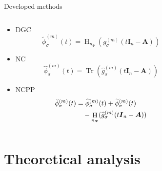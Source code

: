 \documentclass[aspectratio=169, leqno, 12pt]{beamer}
\newcommand{\mtx}[1]{\boldsymbol{#1}}
\DeclareMathOperator{\Tr}{Tr}
\DeclareMathOperator{\Hutch}{H}
\begin{document}
\begin{frame}{Developed methods}
    \begin{columns}
        \begin{column}{0.55\textwidth}
            \begin{itemize}
                \item \gls{DGC}
                \begin{equation}
                    \widetilde{\phi}_{\sigma}^{(m)}(t) = \Hutch_{n_{\Psi}}(g_{\sigma}^{(m)}(t\mtx{I}_n - \mtx{A}))
                \end{equation}
                \item \gls{NC}
                \begin{equation}
                    \widehat{\phi}_{\sigma}^{(m)}(t) = \Tr(\widehat{g}_{\sigma}^{(m)}(t\mtx{I}_n - \mtx{A}))
                \end{equation}
                \item \gls{NCPP}
                \begin{align}
                    \breve{\phi}_{\sigma}^{(m)}(t) &= \widehat{\phi}_{\sigma}^{(m)}(t) + \widetilde{\phi}_{\sigma}^{(m)}(t) \notag \\
                    &\hspace{10pt}- \Hutch_{n_{\Psi}}(\widehat{g}_{\sigma}^{(m)}(t\mtx{I}_n - \mtx{A}))
                \end{align}
            \end{itemize}
        \end{column}
        \begin{column}{0.45\textwidth}
            \scalebox{0.7}{}
        \end{column}
    \end{columns}
\end{frame}


\section{Theoretical analysis}
\end{document}
